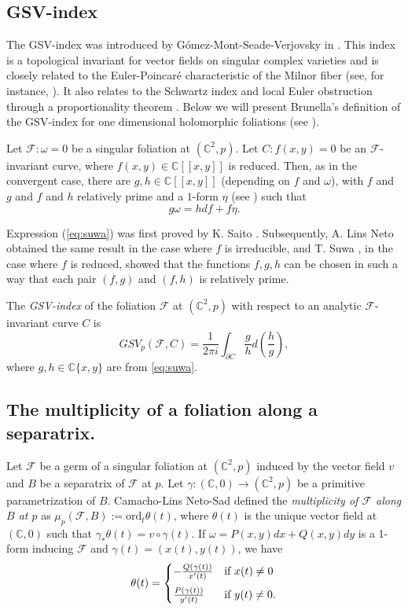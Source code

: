 \documentclass[11pt]{amsart}
\newcommand{\C}{\mathbb{C}}
\newcommand{\F}{\mathcal{F}}
\newcommand{\ord}{\text{ord}}
\begin{document}
\subsection{GSV-index}
The GSV-index was introduced by G\'omez-Mont-Seade-Verjovsky in \cite{GSV}. This index is a topological invariant for vector fields on singular complex varieties and is closely related to the Euler-Poincar\'e characteristic of the Milnor fiber (see, for instance, \cite[Theorem 3.1]{Callejas}). It also relates to the Schwartz index and local Euler obstruction through a proportionality theorem \cite[Theorem 3.1]{brasselet}. Below we will present Brunella’s definition of the GSV-index for one dimensional holomorphic foliations (see \cite{index}).
\par Let $\F: \omega=0$ be a singular foliation at $(\mathbb C^2,p)$. Let $C:f(x,y)=0$ be an $\F$-invariant curve, where $f(x,y)\in \C[[x,y]]$ is reduced. Then, as in the convergent case, there are $g,h\in \C[[x,y]]$ (depending on $f$ and $\omega$), with $f$ and $g$ and $f$ and $h$ relatively prime and a $1$-form $\eta$ (see \cite[Lemma 1.1 and its proof]{suwa1995}) such that 
\begin{equation}\label{eq:suwa}
g\omega=hdf+f\eta.
\end{equation}

Expression (\ref{eq:suwa}) was first proved by K. Saito \cite{Saito2}. Subsequently, A. Lins Neto \cite{neto} obtained the same result in the case where $f$ is irreducible, and T. Suwa \cite{suwa1995}, in the case where $f$ is reduced, showed that the functions $f,g,h$ can be chosen in such a way that each pair $(f,g)$ and $(f,h)$ is relatively prime.

The {\em GSV-index} of the foliation $\F$  at $(\C^2,p)$ with respect to an analytic $\F$-invariant  curve $C$ is
\begin{equation}
\label{eq:GSV}
GSV_p(\F,C)=\frac{1}{2\pi i}\int_{\partial C}\frac{g}{h}d\left(\frac{h}{g}\right),
\end{equation}
where $g,h\in \C\{x,y\}$ are from \eqref{eq:suwa}. 
\subsection{The multiplicity of a foliation along a separatrix.}
Let $\F$ be a germ of a singular foliation at $(\C^2,p)$ induced by the vector field $v$ and $B$ be a separatrix of $\F$ at $p$. Let $\gamma: (\C,0)\to(\C^2,p)$ be a primitive parametrization of $B$. Camacho-Lins Neto-Sad \cite[Section 4]{CLS} defined 
the \textit{multiplicity of $\F$ along $B$ at $p$} as
$\mu_p(\F,B):=\ord_t \theta(t)$,
where $\theta(t)$ is the unique vector field at $(\C,0)$ such that 
$\gamma_{*} \theta(t)=v\circ\gamma(t)$. 
If $\omega=P(x,y)dx+Q(x,y)dy$ is a 1-form inducing $\F$ and $\gamma(t)=(x(t),y(t))$, we have
\begin{equation*}
\theta(t)=
\begin{cases}
-\frac{Q(\gamma(t))}{x'(t)} & \text{if $x(t)\neq 0$}
\medskip \\
 \frac{P(\gamma(t))}{y'(t)} & \text{if $y(t)\neq 0$}.
\end{cases}
\end{equation*}
\end{document}

